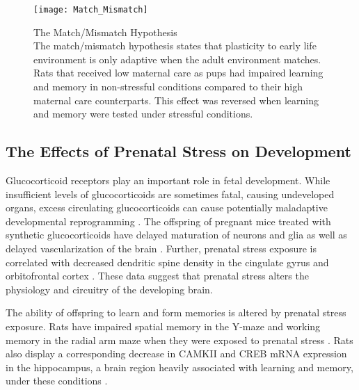 \documentclass[12pt,twoside]{reedthesis}
\begin{document}
 \begin{figure}[htbp] 
\begin{centering} 
\texttt{[image: Match\_Mismatch]}
\caption[The Match/Mismatch Hypothesis]{\footnotesize{The Match/Mismatch
    Hypothesis \\ The match/mismatch hypothesis states that plasticity to early
    life environment is only adaptive when the adult environment matches. Rats
    that received low maternal care as pups had impaired learning and memory in
    non-stressful conditions compared to their high maternal care counterparts.
    This effect was reversed when learning and memory were tested under
    stressful conditions.}}
\label{subd}
\end{centering} 
\end{figure}

\subsection{The Effects of Prenatal Stress on Development}
Glucocorticoid receptors play an important role in fetal development. While
insufficient levels of glucocorticoids are sometimes fatal, causing undeveloped organs,
excess circulating glucocorticoids can cause potentially maladaptive developmental
reprogramming \citep{2017Nrid}. The offspring of pregnant mice treated with synthetic glucocorticoids
 have delayed maturation of neurons and glia as well as delayed vascularization
 of the brain \citep{gravanis_hormones_2011}. Further, prenatal stress exposure is correlated with
 decreased dendritic spine density in the cingulate gyrus and orbitofrontal
 cortex \citep{murmu_changes_2006}. These data suggest that prenatal stress alters the
 physiology and circuitry of the developing brain.

 The ability of offspring to learn and form memories is altered by prenatal
 stress exposure. Rats have impaired spatial memory in the Y-maze and
 working memory in the radial arm maze when they were exposed to prenatal stress
 \citep{vallee_long-term_1999}. Rats also display a corresponding
 decrease in CAMKII and CREB mRNA expression in the hippocampus, a brain region
 heavily associated with learning and memory, under these
 conditions \citep{sun_prenatal_2017}. 
\end{document}
